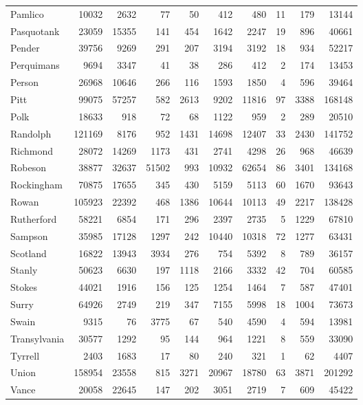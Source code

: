 \documentclass[12pt,]{article}
\begin{document}
\begin{tabular}{lrrrrrrrrr}
Pamlico & 10032 & 2632 & 77 & 50 & 412 & 480 & 11 & 179 & 13144\\
Pasquotank & 23059 & 15355 & 141 & 454 & 1642 & 2247 & 19 & 896 & 40661\\
\addlinespace
Pender & 39756 & 9269 & 291 & 207 & 3194 & 3192 & 18 & 934 & 52217\\
Perquimans & 9694 & 3347 & 41 & 38 & 286 & 412 & 2 & 174 & 13453\\
Person & 26968 & 10646 & 266 & 116 & 1593 & 1850 & 4 & 596 & 39464\\
Pitt & 99075 & 57257 & 582 & 2613 & 9202 & 11816 & 97 & 3388 & 168148\\
Polk & 18633 & 918 & 72 & 68 & 1122 & 959 & 2 & 289 & 20510\\
\addlinespace
Randolph & 121169 & 8176 & 952 & 1431 & 14698 & 12407 & 33 & 2430 & 141752\\
Richmond & 28072 & 14269 & 1173 & 431 & 2741 & 4298 & 26 & 968 & 46639\\
Robeson & 38877 & 32637 & 51502 & 993 & 10932 & 62654 & 86 & 3401 & 134168\\
Rockingham & 70875 & 17655 & 345 & 430 & 5159 & 5113 & 60 & 1670 & 93643\\
Rowan & 105923 & 22392 & 468 & 1386 & 10644 & 10113 & 49 & 2217 & 138428\\
\addlinespace
Rutherford & 58221 & 6854 & 171 & 296 & 2397 & 2735 & 5 & 1229 & 67810\\
Sampson & 35985 & 17128 & 1297 & 242 & 10440 & 10318 & 72 & 1277 & 63431\\
Scotland & 16822 & 13943 & 3934 & 276 & 754 & 5392 & 8 & 789 & 36157\\
Stanly & 50623 & 6630 & 197 & 1118 & 2166 & 3332 & 42 & 704 & 60585\\
Stokes & 44021 & 1916 & 156 & 125 & 1254 & 1464 & 7 & 587 & 47401\\
\addlinespace
Surry & 64926 & 2749 & 219 & 347 & 7155 & 5998 & 18 & 1004 & 73673\\
Swain & 9315 & 76 & 3775 & 67 & 540 & 4590 & 4 & 594 & 13981\\
Transylvania & 30577 & 1292 & 95 & 144 & 964 & 1221 & 8 & 559 & 33090\\
Tyrrell & 2403 & 1683 & 17 & 80 & 240 & 321 & 1 & 62 & 4407\\
Union & 158954 & 23558 & 815 & 3271 & 20967 & 18780 & 63 & 3871 & 201292\\
\addlinespace
Vance & 20058 & 22645 & 147 & 202 & 3051 & 2719 & 7 & 609 & 45422\\

\end{tabular}
\end{document}
